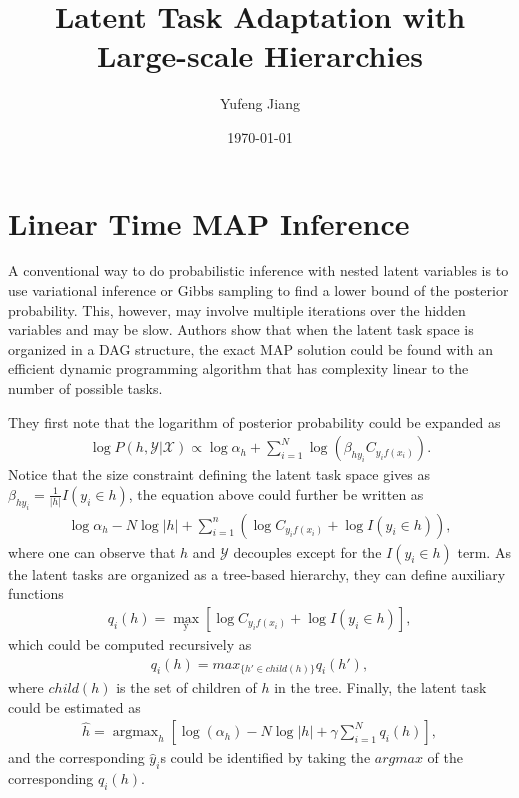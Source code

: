 \documentclass[10pt,twocolumn,letterpaper]{article}
\begin{document}
\title{Latent Task Adaptation with Large-scale Hierarchies}
\author{Yufeng Jiang}
\date{\today}
\maketitle
\section{Linear Time MAP Inference}
A conventional way to do probabilistic inference with nested latent variables is to use variational inference or Gibbs sampling to find a lower bound of the posterior probability. This, however, may involve multiple iterations over the hidden variables and may be slow. Authors show that when the latent task space is organized in a DAG structure, the exact MAP solution could be found with an efficient dynamic programming algorithm that has complexity linear to the number of possible tasks.

They first note that the logarithm of posterior probability could be expanded as\\
\begin{gather*}
\log P(h,\mathcal{Y}|\mathcal{X}) \varpropto \log\alpha_h + \sum_{i=1}^N \log(\beta_{hy_i}C_{y_if(x_i)}). \tag{1}
\end{gather*}
Notice that the size constraint defining the latent task space gives as $\beta_{hy_i} = \frac{1}{|h|}I(y_i \in h)$, the equation above could further be written as\\
\begin{gather*}
\log \alpha_h - N\log|h| + \sum_{i=1}^n(\log C_{y_if(x_i)} + \log I(y_i \in h)), \tag{2}
\end{gather*}
where one can observe that $h$ and $\mathcal{Y}$ decouples except for the $I(y_i \in h)$ term. As the latent tasks are organized as a tree-based hierarchy, they can define auxiliary functions\\
\begin{gather*}
q_i(h) = \max_\text{y}[\log C_{y_if(x_i)} + \log I(y_i \in h)], \tag{3}
\end{gather*}
which could be computed recursively as\\
\begin{gather*}
q_i(h) = max_{\{h'\in child(h)\}}q_i(h'), \tag{4}
\end{gather*}
where $child(h)$ is the set of children of $h$ in the tree. Finally, the latent task could be estimated as\\ 
\begin{gather*}
\hat{h} = \mathop{\arg\max}_{h}[\log(\alpha_h) - N\log |h| + \gamma \sum_{i=1}^N q_i(h)], \tag{5}
\end{gather*}
and the corresponding $\hat{y}_i$s could be identified by taking the $argmax$ of the corresponding $q_i(h)$.
\end{document}
